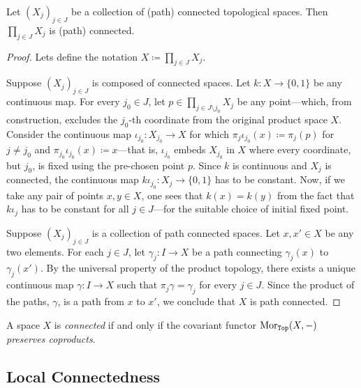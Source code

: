 \begin{proposition}
\label{prop:products-preserve-connectedness}
Let \((X_{j})_{j \in J}\) be a collection of (path) connected topological
spaces. Then \(\prod_{j \in J} X_j\) is (path) connected.
\end{proposition}

\begin{proof}
Lets define the notation \(X \coloneq \prod_{j \in J} X_j\).

Suppose \((X_j)_{j \in J}\) is composed of connected spaces. Let
\(k: X \to \{0, 1\}\) be any continuous map. For every \(j_0 \in J\), let
\(p \in \prod_{j \in J \setminus j_0} X_j\) be any point---which, from
construction, excludes the \(j_0\)-th coordinate from the original product space
\(X\). Consider the continuous map \(\iota_{j_0}: X_{j_0} \to X\) for which
\(\pi_j \iota_{j_0}(x) \coloneq \pi_j(p)\) for \(j \neq j_0\) and
\(\pi_{j_0}\iota_{j_0}(x) \coloneq x\)---that is, \(\iota_{j_0}\) embeds
\(X_{j_0}\) in \(X\) where every coordinate, but \(j_0\), is fixed using the
pre-chosen point \(p\). Since \(k\) is continuous and \(X_j\) is connected, the
continuous map \(k \iota_{j_0}: X_j \to \{0, 1\}\) has to be constant. Now, if
we take any pair of points \(x, y \in X\), one sees that \(k(x) = k(y)\) from
the fact that \(k \iota_j\) has to be constant for all \(j \in J\)---for the
suitable choice of initial fixed point.

Suppose \((X_j)_{j \in J}\) is a collection of path connected spaces. Let
\(x, x' \in X\) be any two elements. For each \(j \in J\), let
\(\gamma_j: I \to X\) be a path connecting \(\gamma_j(x)\) to
\(\gamma_j(x')\). By the universal property of the product topology, there
exists a unique continuous map \(\gamma: I \to X\) such that
\(\pi_j \gamma = \gamma_j\) for every \(j \in J\). Since the product of the
paths, \(\gamma\), is a path from \(x\) to \(x'\), we conclude that \(X\) is
path connected.
\end{proof}

\begin{theorem}
\label{thm:connected-iff-cov-preserves-coprod}
A space \(X\) is \emph{connected} if and only if the covariant functor
\(\operatorname{Mor}_{{\texttt{Top}}}(X, -)\) \emph{preserves coproducts}.
\end{theorem}


\subsection{Local Connectedness}

